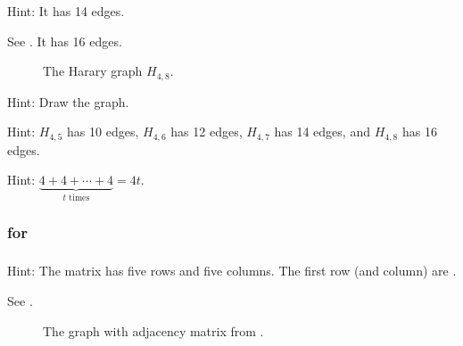 \subsubsection*{ \answers}
\begin{apart}
    \item Hint: It has 14 edges.
    \item See .  It has 16 edges.

    \begin{figure}[hbtp]
        \centering
        
        \caption{The Harary graph $H_{4,8}$.}
        \label{fig_Harary4b8}
    \end{figure}
    \item Hint: Draw the graph.
    \item Hint: $H_{4,5}$ has 10 edges, $H_{4,6}$ has 12 edges, $H_{4,7}$ has 14 edges, and $H_{4,8}$ has 16 edges.
    \item Hint: $\underbrace{4+4+ \cdots + 4}_{t \text{ times}}=4t.$
\end{apart}


\subsubsection{\answers for  \subadjmat}

\subsubsection*{ \answers}
\begin{apart}
    \item Hint: The matrix has five rows and five columns.  The first row (and column) are .
    \item See .

    \begin{figure}[hbtp]
        \centering
        
        \caption{The graph with adjacency matrix from .}
      \label{fig_graph_from_adjmat}
    \end{figure}
\end{apart}

